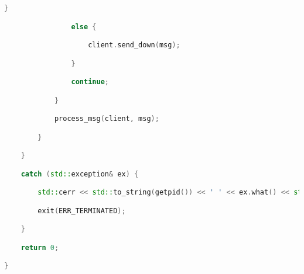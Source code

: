 \begin{lstlisting}[language=C++]
                } 

                else {

                    client.send_down(msg);

                }

                continue;

            }

            process_msg(client, msg);

        }

    } 

    catch (std::exception& ex) {

        std::cerr << std::to_string(getpid()) << ' ' << ex.what() << std::endl;

        exit(ERR_TERMINATED);

    }

    return 0;

}

\end{lstlisting}

\pagebreak
